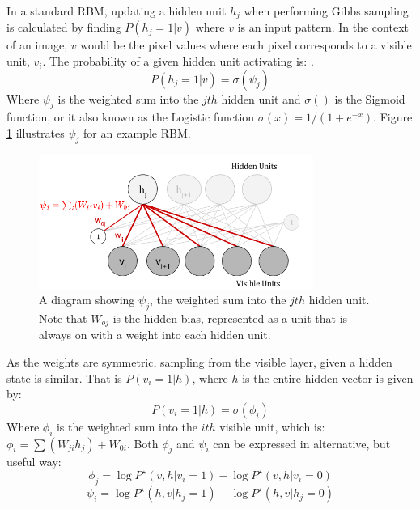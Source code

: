     In a standard RBM, updating a hidden unit $h_j$ when performing Gibbs sampling is calculated by finding $ P(h_j = 1 | v) $ where $v$ is an input pattern. In the context of an image, $ v $ would be the pixel values where each pixel corresponds to a visible unit, $v_i$.
    The probability of a given hidden unit activating is: .
    \begin{equation}\label{eq:Hid-Gibbs-Update}
    P(h_j = 1 | v) = \sigma(\psi_j)
    \end{equation}
    Where $\psi_j$ is the weighted sum into the $jth$ hidden unit and $\sigma()$ is the Sigmoid function, or it also known as the Logistic function $\sigma(x)=1/(1+e^{-x})$. Figure \ref{F:PSI} illustrates $\psi_j$ for an example RBM.
    \begin{figure}[h]
    \begin{center}
      \includegraphics[width = 0.8\textwidth]{Assets/PSI_and_PHI.png}
    \caption{A diagram showing $\psi_j$, the weighted sum into the $jth$ hidden unit. Note that $W_{oj}$ is the hidden bias, represented as a unit that is always on with a weight into each hidden unit.}
    \label{F:PSI}
    \end{center}
    \end{figure}
    As the weights are symmetric, sampling from the visible layer, given a hidden state is similar. That is $P(v_i = 1 | h)$, where $h$ is the entire hidden vector is given by:
    \begin{equation}\label{eq:Vis-Gibbs-Update}
     P(v_i = 1 | h) = \sigma(\phi_{i})
    \end{equation}
    Where $\phi_i$ is the weighted sum into the $ith$ visible unit, which is: $ \phi_i = \sum(W_{ji}h_{j}) + W_{0i} $. Both $\phi_j$ and $\psi_i$ can be expressed in alternative, but useful way:
    \begin{equation}
    \phi_j = \log P^\star(v,h | v_i = 1) - \log P^\star(v,h | v_i = 0)
    \end{equation}
    \begin{equation}\label{psi-gibbs-update-rbm}
    \psi_i = \log P^\star(h,v | h_j = 1) - \log P^\star(h,v | h_j = 0)
    \end{equation}



